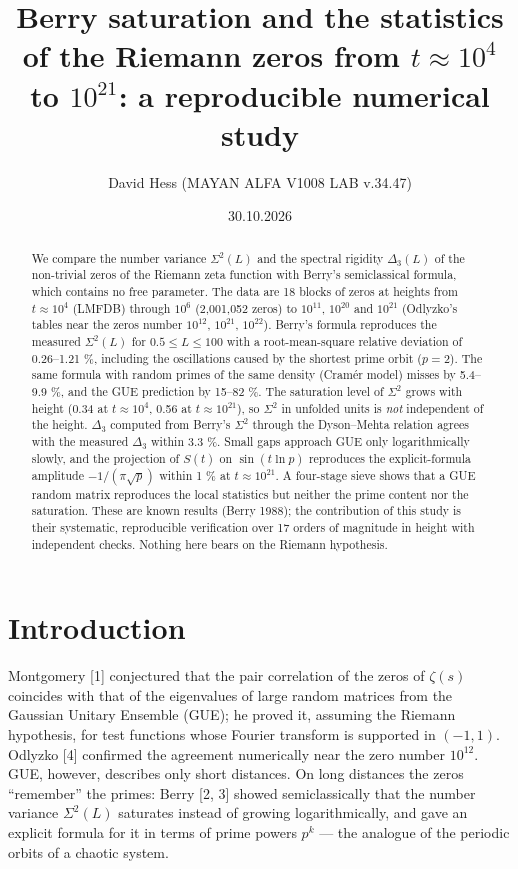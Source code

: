 \documentclass[11pt]{article}
\title{Berry saturation and the statistics of the Riemann zeros from $t \approx 10^4$ to $10^{21}$: a reproducible numerical study}
\author{David Hess (MAYAN ALFA V1008 LAB v.34.47)}
\date{30.10.2026}
\begin{document}
\maketitle
\begin{abstract}
We compare the number variance \(\Sigma^2(L)\) and the spectral rigidity
\(\Delta_3(L)\) of the non-trivial zeros of the Riemann zeta function
with Berry's semiclassical formula, which contains no free parameter.
The data are 18 blocks of zeros at heights from \(t \approx 10^4\)
(LMFDB) through \(10^6\) (2,001,052 zeros) to \(10^{11}\), \(10^{20}\)
and \(10^{21}\) (Odlyzko's tables near the zeros number \(10^{12}\),
\(10^{21}\), \(10^{22}\)). Berry's formula reproduces the measured
\(\Sigma^2(L)\) for \(0.5 \le L \le 100\) with a root-mean-square
relative deviation of 0.26--1.21 \%, including the oscillations caused
by the shortest prime orbit (\(p = 2\)). The same formula with random
primes of the same density (Cramér model) misses by 5.4--9.9 \%, and the
GUE prediction by 15--82 \%. The saturation level of \(\Sigma^2\) grows
with height (0.34 at \(t \approx 10^4\), 0.56 at \(t \approx 10^{21}\)),
so \(\Sigma^2\) in unfolded units is \emph{not} independent of the
height. \(\Delta_3\) computed from Berry's \(\Sigma^2\) through the
Dyson--Mehta relation agrees with the measured \(\Delta_3\) within 3.3
\%. Small gaps approach GUE only logarithmically slowly, and the
projection of \(S(t)\) on \(\sin(t \ln p)\) reproduces the
explicit-formula amplitude \(-1/(\pi\sqrt{p})\) within 1 \% at
\(t \approx 10^{21}\). A four-stage sieve shows that a GUE random matrix
reproduces the local statistics but neither the prime content nor the
saturation. These are known results (Berry 1988); the contribution of
this study is their systematic, reproducible verification over 17 orders
of magnitude in height with independent checks. Nothing here bears on
the Riemann hypothesis.
\end{abstract}

\hypertarget{introduction}{%
\section{Introduction}\label{introduction}}

Montgomery {[}1{]} conjectured that the pair correlation of the zeros of
\(\zeta(s)\) coincides with that of the eigenvalues of large random
matrices from the Gaussian Unitary Ensemble (GUE); he proved it,
assuming the Riemann hypothesis, for test functions whose Fourier
transform is supported in \((-1, 1)\). Odlyzko {[}4{]} confirmed the
agreement numerically near the zero number \(10^{12}\). GUE, however,
describes only short distances. On long distances the zeros ``remember''
the primes: Berry {[}2, 3{]} showed semiclassically that the number
variance \(\Sigma^2(L)\) saturates instead of growing logarithmically,
and gave an explicit formula for it in terms of prime powers \(p^k\) ---
the analogue of the periodic orbits of a chaotic system.
\end{document}
